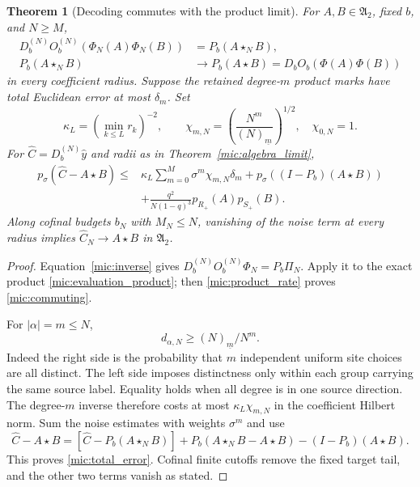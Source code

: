 \documentclass[11pt,a4paper]{amsart}
\numberwithin{equation}{section}
\newtheorem{theorem}{Theorem}[section]
\theoremstyle{definition}
\theoremstyle{remark}
\newcommand{\Alg}{\mathfrak A}
\begin{document}
\begin{theorem}[Decoding commutes with the product limit]\label{mic:decoder}
For $A,B\in\Alg_2$, fixed $b$, and $N\ge M$,
\begin{equation}\label{mic:commuting}
 \begin{aligned}
 D_b^{(N)}O_b^{(N)}(\Phi_N(A)\Phi_N(B))&=P_b(A\star_NB),\\
 P_b(A\star_NB)&\longrightarrow P_b(A\star B)
   =D_bO_b(\Phi(A)\Phi(B))
 \end{aligned}
\end{equation}
in every coefficient radius. Suppose the retained degree-$m$ product marks have total Euclidean error at most $\delta_m$. Set
\[
 \kappa_L=(\min_{k\le L}r_k)^{-2},\qquad
 \chi_{m,N}=\left(\frac{N^m}{(N)_{\underline m}}\right)^{1/2},\quad\chi_{0,N}=1.
\]
For $\widehat C=D_b^{(N)}\widehat y$ and radii as in Theorem~\ref{mic:algebra_limit},
\begin{equation}\label{mic:total_error}
 \begin{split}
 p_\sigma(\widehat C-A\star B)\le{}&
 \kappa_L\sum_{m=0}^M\sigma^m\chi_{m,N}\delta_m
   +p_\sigma((I-P_b)(A\star B))\\
 &+\frac{q^2}{N(1-q)^3}p_{R_+}(A)p_{S_+}(B).
 \end{split}
\end{equation}
Along cofinal budgets $b_N$ with $M_N\le N$, vanishing of the noise term at every radius implies $\widehat C_N\to A\star B$ in $\Alg_2$.
\end{theorem}
\begin{proof}
Equation~\eqref{mic:inverse} gives $D_b^{(N)}O_b^{(N)}\Phi_N=P_b\Pi_N$. Apply it to the exact product \eqref{mic:evaluation_product}; then \eqref{mic:product_rate} proves \eqref{mic:commuting}.

For $|\alpha|=m\le N$,
\begin{equation}\label{mic:worst_gram}
 d_{\alpha,N}\ge(N)_{\underline m}/N^m.
\end{equation}
Indeed the right side is the probability that $m$ independent uniform site choices are all distinct. The left side imposes distinctness only within each group carrying the same source label. Equality holds when all degree is in one source direction. The degree-$m$ inverse therefore costs at most $\kappa_L\chi_{m,N}$ in the coefficient Hilbert norm. Sum the noise estimates with weights $\sigma^m$ and use
\[
 \widehat C-A\star B
 =[\widehat C-P_b(A\star_NB)]
  +P_b(A\star_NB-A\star B)-(I-P_b)(A\star B).
\]
This proves \eqref{mic:total_error}. Cofinal finite cutoffs remove the fixed target tail, and the other two terms vanish as stated.
\end{proof}
\end{document}
